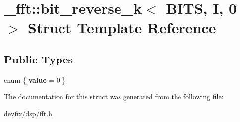 \hypertarget{struct__fft_1_1bit__reverse__k_3_01BITS_00_01I_00_010_01_4}{}\section{\+\_\+fft\+:\+:bit\+\_\+reverse\+\_\+k$<$ B\+I\+TS, I, 0 $>$ Struct Template Reference}
\label{struct__fft_1_1bit__reverse__k_3_01BITS_00_01I_00_010_01_4}
\subsection*{Public Types}
\begin{DoxyCompactItemize}
\item 
\mbox{\label{struct__fft_1_1bit__reverse__k_3_01BITS_00_01I_00_010_01_4_aaefa66445514c74ed6ca3bce67ab5048}} 
enum \{ {\bfseries value} = 0
 \}
\end{DoxyCompactItemize}


The documentation for this struct was generated from the following file\+:\begin{DoxyCompactItemize}
\item 
devfix/dsp/fft.\+h\end{DoxyCompactItemize}

